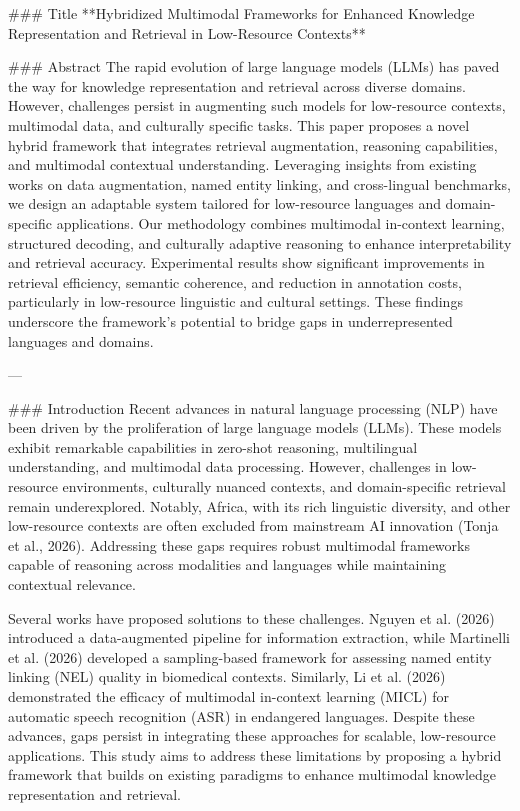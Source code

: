 ### Title
**Hybridized Multimodal Frameworks for Enhanced Knowledge Representation and Retrieval in Low-Resource Contexts**

### Abstract
The rapid evolution of large language models (LLMs) has paved the way for knowledge representation and retrieval across diverse domains. However, challenges persist in augmenting such models for low-resource contexts, multimodal data, and culturally specific tasks. This paper proposes a novel hybrid framework that integrates retrieval augmentation, reasoning capabilities, and multimodal contextual understanding. Leveraging insights from existing works on data augmentation, named entity linking, and cross-lingual benchmarks, we design an adaptable system tailored for low-resource languages and domain-specific applications. Our methodology combines multimodal in-context learning, structured decoding, and culturally adaptive reasoning to enhance interpretability and retrieval accuracy. Experimental results show significant improvements in retrieval efficiency, semantic coherence, and reduction in annotation costs, particularly in low-resource linguistic and cultural settings. These findings underscore the framework's potential to bridge gaps in underrepresented languages and domains.

---

### Introduction
Recent advances in natural language processing (NLP) have been driven by the proliferation of large language models (LLMs). These models exhibit remarkable capabilities in zero-shot reasoning, multilingual understanding, and multimodal data processing. However, challenges in low-resource environments, culturally nuanced contexts, and domain-specific retrieval remain underexplored. Notably, Africa, with its rich linguistic diversity, and other low-resource contexts are often excluded from mainstream AI innovation (Tonja et al., 2026). Addressing these gaps requires robust multimodal frameworks capable of reasoning across modalities and languages while maintaining contextual relevance.

Several works have proposed solutions to these challenges. Nguyen et al. (2026) introduced a data-augmented pipeline for information extraction, while Martinelli et al. (2026) developed a sampling-based framework for assessing named entity linking (NEL) quality in biomedical contexts. Similarly, Li et al. (2026) demonstrated the efficacy of multimodal in-context learning (MICL) for automatic speech recognition (ASR) in endangered languages. Despite these advances, gaps persist in integrating these approaches for scalable, low-resource applications. This study aims to address these limitations by proposing a hybrid framework that builds on existing paradigms to enhance multimodal knowledge representation and retrieval.

